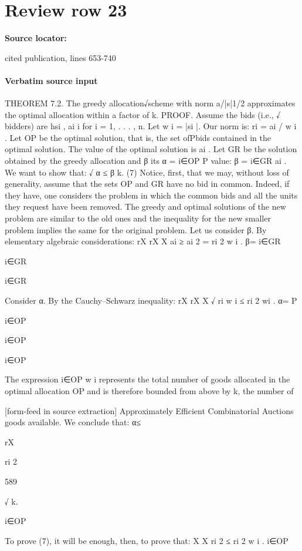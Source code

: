 \documentclass[10pt]{article}
\begin{document}
\section*{Review row 23}
\textbf{Source locator:} {\footnotesize\raggedright cited publication, lines 653-\allowbreak{}740\par}
\paragraph{Verbatim source input}
\begin{ReviewVerbatim}
THEOREM 7.2. The greedy allocation√scheme with norm a/|s|1/2 approximates
the optimal allocation within a factor of k.
PROOF. Assume the bids (i.e.,
√ bidders) are hsi , ai i for i = 1, . . . , n. Let
w i = |si |. Our norm is: ri = ai / w i . Let OP be the optimal solution, that is, the
set ofPbids contained in the optimal solution. The value of the optimal solution is
ai . Let GR be the solution obtained by the greedy allocation and β its
α = i∈OP P
value: β = i∈GR ai . We want to show that:
√
α ≤ β k.
(7)
Notice, first, that we may, without loss of generality, assume that the sets OP and
GR have no bid in common. Indeed, if they have, one considers the problem in
which the common bids and all the units they request have been removed. The
greedy and optimal solutions of the new problem are similar to the old ones and the
inequality for the new smaller problem implies the same for the original problem.
Let us consider β. By elementary algebraic considerations:
rX
rX
X
ai ≥
ai 2 =
ri 2 w i .
β=
i∈GR

i∈GR

i∈GR

Consider α. By the Cauchy–Schwarz inequality:
rX
rX
X √
ri w i ≤
ri 2
wi .
α=
P

i∈OP

i∈OP

i∈OP

The expression i∈OP w i represents the total number of goods allocated in the
optimal allocation OP and is therefore bounded from above by k, the number of


[form-feed in source extraction]
Approximately Efficient Combinatorial Auctions
goods available. We conclude that:
α≤

rX

ri 2

589

√
k.

i∈OP

To prove (7), it will be enough, then, to prove that:
X
X
ri 2 ≤
ri 2 w i .
i∈OP


\end{ReviewVerbatim}
\end{document}
